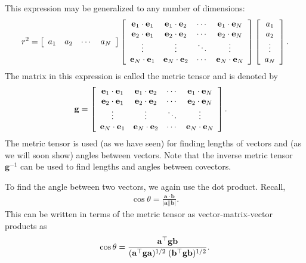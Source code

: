 This expression may be generalized to any number of dimensions:
\begin{align}
  r^2 = \left[ \begin{array}{c c c c} a_1 & a_2 & \cdots & a_N \\ \end{array} \right]
        \left[ \begin{array}{c c c c} \mathbf{e}_1 \cdot \mathbf{e}_1 & \mathbf{e}_1 \cdot \mathbf{e}_2 & \cdots & \mathbf{e}_1 \cdot \mathbf{e}_N \\
      							      \mathbf{e}_2 \cdot \mathbf{e}_1 & \mathbf{e}_2 \cdot \mathbf{e}_2 & \cdots & \mathbf{e}_2 \cdot \mathbf{e}_N \\ 
							      	  \vdots & \vdots & \ddots & \vdots \\
								      \mathbf{e}_N \cdot \mathbf{e}_1 & \mathbf{e}_N \cdot \mathbf{e}_2 & \cdots & \mathbf{e}_N \cdot \mathbf{e}_N\end{array} \right]
	    \left[ \begin{array}{c} a_1 \\ a_2 \\ \vdots \\ a_N \end{array} \right] .
\end{align}
The matrix in this expression is called the metric tensor and is denoted by
\begin{align}
  \mathbf{g} &= \left[ \begin{array}{c c c c} \mathbf{e}_1 \cdot \mathbf{e}_1 & \mathbf{e}_1 \cdot \mathbf{e}_2 & \cdots & \mathbf{e}_1 \cdot \mathbf{e}_N \\
      							      		  \mathbf{e}_2 \cdot \mathbf{e}_1 & \mathbf{e}_2 \cdot \mathbf{e}_2 & \cdots & \mathbf{e}_2 \cdot \mathbf{e}_N \\ 
							      	  		  \vdots & \vdots & \ddots & \vdots \\
								      		  \mathbf{e}_N \cdot \mathbf{e}_1 & \mathbf{e}_N \cdot \mathbf{e}_2 & \cdots & \mathbf{e}_N \cdot \mathbf{e}_N\end{array} \right] .
\end{align}
The metric tensor is used (as we have seen) for finding lengths of vectors and (as we will soon show) angles between vectors. Note that the inverse metric tensor $\mathbf{g}^{-1}$ can be used to find lengths and angles between covectors.

To find the angle between two vectors, we again use the dot product. Recall,
\begin{align}
  \cos \theta = \frac{ \mathbf{a} \cdot \mathbf{b} }{ | \mathbf{a} | | \mathbf{b} | }. \nonumber
\end{align}
This can be written in terms of the metric tensor as vector-matrix-vector products as
\begin{align}
  \cos \theta = \frac{ \mathbf{a}^\top \mathbf{g} \mathbf{b} }{ ( \mathbf{a}^\top \mathbf{g} \mathbf{a} )^{1/2} \hspace{0.1cm} ( \mathbf{b}^\top \mathbf{g} \mathbf{b} )^{1/2} }. \nonumber
\end{align}

